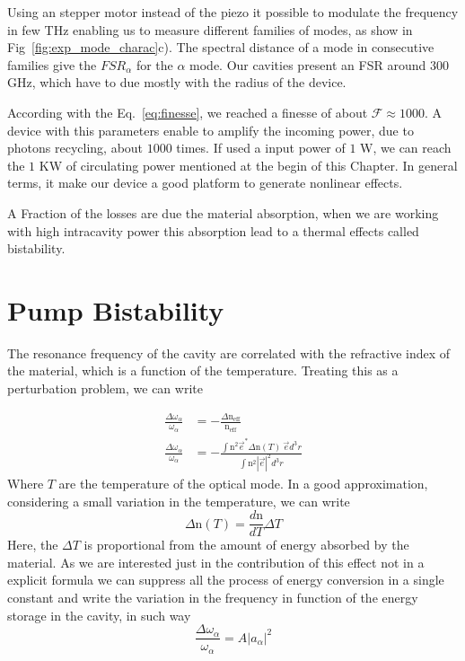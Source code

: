 Using an stepper motor instead of the piezo it possible to modulate the frequency in few THz enabling us to measure different families of modes, as show in Fig~\ref{fig:exp_mode_charac}c). The spectral distance of a mode in consecutive families give the $FSR_\alpha$ for the $\alpha$ mode. Our cavities present an FSR around $300$ GHz, which have to due mostly with the radius of the device. 

According with the Eq.~\ref{eq:finesse}, we reached a finesse of about $\mathcal{F} \approx 1000$. A device with this parameters enable to amplify the incoming power, due to photons recycling, about $1000$ times. If used a input power of $1$ W, we can reach the $1$ KW of circulating power mentioned at the begin of this Chapter. In general terms, it make our device a good platform to generate nonlinear effects. 

A Fraction of the losses are due the material absorption, when we are working with high intracavity power this absorption lead to a thermal effects called bistability. 

\section{Pump Bistability}

The resonance frequency of the cavity are correlated with the refractive index of the material, which is a function of the temperature. Treating this as a perturbation problem, we can write 

\begin{subequations}
    \begin{alignat}{2}
        \frac{\Delta\omega_\alpha}{\omega_\alpha} &= -\frac{\Delta \text{n}_\text{eff}}{\text{n}_\text{eff}}\\
        \frac{\Delta\omega_\alpha}{\omega_\alpha} &= -\frac{\int \text{n}^2\vec{e}^*\Delta\text{n}(T)~\vec{e} d^3r}
        {\int \text{n}^2 |\vec{e}|^2 d^3r}
    \end{alignat}
\end{subequations}
Where $T$ are the temperature of the optical mode. In a good approximation, considering a small variation in the temperature, we can write
\begin{equation}
    \Delta \text{n}(T) = \frac{d\text{n}}{dT}\Delta T
\end{equation}
Here, the $\Delta T$ is proportional from the amount of energy absorbed by the material. As we are interested just in the contribution of this effect not in a explicit formula we can suppress all the process of energy conversion in a single constant and write the variation in the frequency in function of the energy storage in the cavity, in such way
\begin{equation}
\frac{\Delta \omega_\alpha}{\omega_\alpha} = A |a_\alpha|^2
\label{eq:pertubation_bistaliti_cavity}
\end{equation}   

